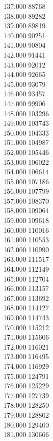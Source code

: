 { 137.000	88768 \\
 138.000	89282 \\
 139.000	89819 \\
 140.000	90251 \\
 141.000	90804 \\
 142.000	91441 \\
 143.000	92012 \\
 144.000	92665 \\
 145.000	93079 \\
 146.000	93457 \\
 147.000	99906 \\
 148.000	103296 \\
 149.000	103743 \\
 150.000	104333 \\
 151.000	104987 \\
 152.000	105446 \\
 153.000	106022 \\
 154.000	106614 \\
 155.000	107186 \\
 156.000	107799 \\
 157.000	108370 \\
 158.000	109064 \\
 159.000	109618 \\
 160.000	110016 \\
 161.000	110553 \\
 162.000	110990 \\
 163.000	111517 \\
 164.000	112149 \\
 165.000	112704 \\
 166.000	113157 \\
 167.000	113692 \\
 168.000	114127 \\
 169.000	114743 \\
 170.000	115212 \\
 171.000	115606 \\
 172.000	116021 \\
 173.000	116495 \\
 174.000	116929 \\
 175.000	124791 \\
 176.000	125229 \\
 177.000	127739 \\
 178.000	128250 \\
 179.000	128802 \\
 180.000	129400 \\
 181.000	130666 \\
}
